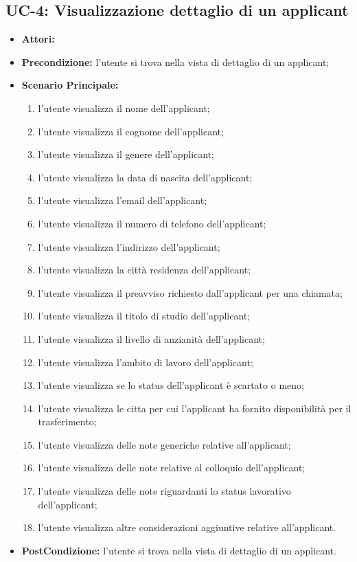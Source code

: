 \subsection{UC-4: Visualizzazione dettaglio di un applicant }
\begin{itemize}
	\item \textbf{Attori:} \loggedusr
	\item \textbf{Precondizione:}  l'utente si trova nella vista di dettaglio di un applicant;
	\item \textbf{Scenario Principale:}
	\begin{enumerate}
		\item l'utente visualizza il nome dell'applicant;
		\item l'utente visualizza il cognome dell'applicant;
		\item l'utente visualizza il genere dell'applicant;
		\item l'utente visualizza la data di nascita dell'applicant;
		\item l'utente visualizza l'email dell'applicant;
		\item l'utente visualizza il numero di telefono dell'applicant;	
		\item l'utente visualizza l'indirizzo dell'applicant;
		\item l'utente visualizza la città residenza dell'applicant;
		\item l'utente visualizza il preavviso richiesto dall'applicant per una chiamata;
		\item l'utente visualizza il titolo di studio dell'applicant;
		\item l'utente visualizza il livello di anzianità dell'applicant;
		\item l'utente visualizza l'ambito di lavoro dell'applicant;
		\item l'utente visualizza se lo status dell'applicant è scartato o meno;
		
		\item l'utente visualizza le citta per cui l'applicant ha fornito disponibilità per il trasferimento;
		\item l'utente visualizza delle note generiche relative all'applicant;
		\item l'utente visualizza delle note relative al colloquio dell'applicant;
		\item l'utente visualizza delle note riguardanti lo status lavorativo dell'applicant;
		\item l'utente visualizza altre considerazioni aggiuntive relative all'applicant.
	\end{enumerate}
	\item \textbf{PostCondizione:}  l'utente si trova nella vista di dettaglio di un applicant.
\end{itemize}

